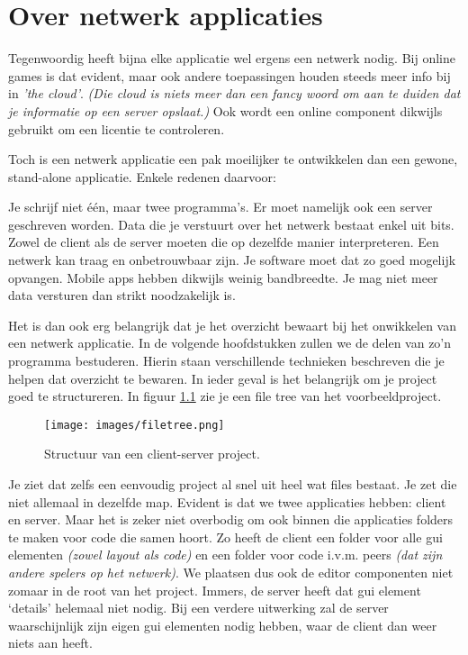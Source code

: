 \chapter{Over netwerk applicaties}
Tegenwoordig heeft bijna elke applicatie wel ergens een netwerk nodig. Bij online games is dat evident, maar ook andere toepassingen houden steeds meer info bij in \textit{'the cloud'}. \textit{(Die cloud is niets meer dan een fancy woord om aan te duiden dat je informatie op een server opslaat.)} Ook wordt een online component dikwijls gebruikt om een licentie te controleren.

Toch is een netwerk applicatie een pak moeilijker te ontwikkelen dan een gewone, stand-alone applicatie. Enkele redenen daarvoor:

\begin{itemize}
\tick Je schrijf niet \'e\'en, maar twee programma's. Er moet namelijk ook een server geschreven worden.
\tick Data die je verstuurt over het netwerk bestaat enkel uit bits. Zowel de client als de server moeten die op dezelfde manier interpreteren.
\tick Een netwerk kan traag en onbetrouwbaar zijn. Je software moet dat zo goed mogelijk opvangen.
\tick Mobile apps hebben dikwijls weinig bandbreedte. Je mag niet meer data versturen dan strikt noodzakelijk is.
\end{itemize}

Het is dan ook erg belangrijk dat je het overzicht bewaart bij het onwikkelen van een netwerk applicatie. In de volgende hoofdstukken zullen we de delen van zo'n programma bestuderen. Hierin staan verschillende technieken beschreven die je helpen dat overzicht te bewaren. In ieder geval is het belangrijk om je project goed te structureren. In figuur \ref{fig:filetree} zie je een file tree van het voorbeeldproject.

\begin{figure}[ht]
\centering
\texttt{[image: images/filetree.png]}
\caption[]{Structuur van een client-server project.}
\label{fig:filetree}
\end{figure}

Je ziet dat zelfs een eenvoudig project al snel uit heel wat files bestaat. Je zet die niet allemaal in dezelfde map. Evident is dat we twee applicaties hebben: client en server. Maar het is zeker niet overbodig om ook binnen die applicaties folders te maken voor code die samen hoort. Zo heeft de client een folder voor alle gui elementen \textit{(zowel layout als code)} en een folder voor code i.v.m. peers \textit{(dat zijn andere spelers op het netwerk)}. We plaatsen dus ook de editor componenten niet zomaar in de root van het project. Immers, de server heeft dat gui element `details' helemaal niet nodig. Bij een verdere uitwerking zal de server waarschijnlijk zijn eigen gui elementen nodig hebben, waar de client dan weer niets aan heeft.

